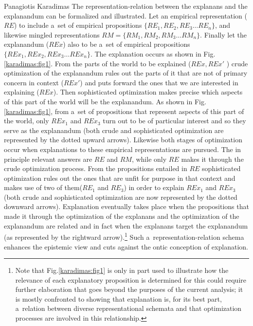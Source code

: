 \begin{artengenv}{Panagiotis Karadimas}
The representation-relation between the explanans and the explanandum can be formalized and illustrated. Let an empirical representation ($RE$) to include a~set of empirical propositions $\{RE_{1}, RE_{2}, RE_{3}…RE_{n}\}$, and likewise mingled representations $RM =\{RM_{1}, RM_{2}, RM_{3}\ldots RM_{n}\}$. Finally let the explanandum ($REx$) also to be a~set of empirical propositions $\{REx_{1}, REx_{2}, REx_{3}… REx_n\}$. The explanation occurs as shown in Fig.\ref{karadimas:fig1}. From the parts of the world to be explained ($REx, REx'$ ) crude optimization of the explanandum rules out the parts of it that are not of primary concern in context ($REx'$) and puts forward the ones that we are interested in explaining ($REx$). Then sophisticated optimization makes precise which aspects of this part of the world will be the explanandum. As shown in Fig.\ref{karadimas:fig1}, from a~set of propositions that represent aspects of this part of the world, only $REx_{1}$ and $REx_{3}$ turn out to be of particular interest and so they serve as the explanandum (both crude and sophisticated optimization are represented by the dotted upward arrows). Likewise both stages of optimization occur when explanations to these empirical representations are pursued. The in principle relevant answers are $RE$ and $RM$, while only $RE$ makes it through the crude optimization process. From the propositions entailed in $RE$ sophisticated optimization rules out the ones that are unfit for purpose in that context and makes use of two of them($RE_{1}$ and $RE_{3}$) in order to explain $REx_{1}$ and $REx_{3}$ (both crude and sophisticated optimization are now represented by the dotted downward arrows). Explanation eventually takes place when the propositions that made it through the optimization of the explanans and the optimization of the explanandum are related and in fact when the explanans target the explanandum (as represented by the rightward arrow).\footnote{Note that Fig.\ref{karadimas:fig1} is only in part used to illustrate how the relevance of each explanatory proposition is determined for this could require further elaboration that goes beyond the purposes of the current analysis; it is mostly confronted to showing that explanation is, for its best part, a~relation between diverse representational schemata and that optimization processes are involved in this relationship.} Such a~representation-relation schema enhances the epistemic view and cuts against the ontic conception of explanation.



\begin{figure}[H]
\centering
\begin{tikzpicture}[>=Stealth,
                    every node/.style={align=center},
                    node distance=2cm, scale=0.8, every node/.append style={transform shape}]


\end{tikzpicture}
\end{figure}
\end{artengenv}
